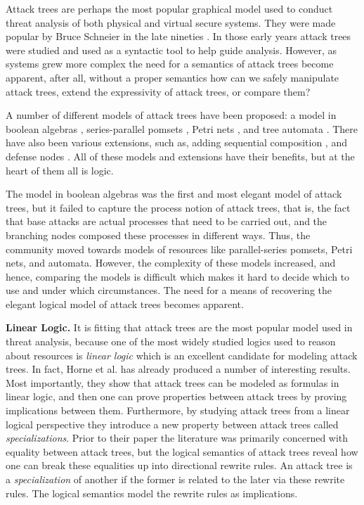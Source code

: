 Attack trees are perhaps the most popular graphical model used to
conduct threat analysis of both physical and virtual secure
systems. They were made popular by Bruce Schneier in the late nineties
\cite{Schneier:1999}.  In those early years attack trees were studied
and used as a syntactic tool to help guide analysis.  However, as
systems grew more complex the need for a semantics of attack trees
become apparent, after all, without a proper semantics how can we
safely manipulate attack trees, extend the expressivity of attack
trees, or compare them?

A number of different models of attack trees have been proposed: a
model in boolean algebras
\cite{Kordy:2014,Kordy:2012,Pietre-Cambacedes:2010}, series-parallel
pomsets \cite{Mauw:2006}, Petri nets \cite{McDermott:2001}, and tree
automata \cite{Camtepe:2007}.  There have also been various
extensions, such as, adding sequential composition \cite{Jhawar:2015},
and defense nodes \cite{Kordy:2011,Kordy:2012}.  All of these models
and extensions have their benefits, but at the heart of them all is
logic.

The model in boolean algebras was the first and most elegant model of
attack trees, but it failed to capture the process notion of attack
trees, that is, the fact that base attacks are actual processes that
need to be carried out, and the branching nodes composed these
processes in different ways.  Thus, the community moved towards models
of resources like parallel-series pomsets, Petri nets, and automata.
However, the complexity of these models increased, and hence,
comparing the models is difficult which makes it hard to decide which
to use and under which circumstances.  The need for a means of
recovering the elegant logical model of attack trees becomes apparent.

\textbf{Linear Logic.}  It is fitting that attack trees are the most
popular model used in threat analysis, because one of the most widely
studied logics used to reason about resources is \emph{linear logic}
which is an excellent candidate for modeling attack trees.  In fact,
Horne et al.\cite{horne2017semantics} has already produced a number of
interesting results.  Most importantly, they show that attack trees
can be modeled as formulas in linear logic, and then one can prove
properties between attack trees by proving implications between them.
Furthermore, by studying attack trees from a linear logical
perspective they introduce a new property between attack trees called
\emph{specializations}.  Prior to their paper the literature was
primarily concerned with equality between attack trees, but the
logical semantics of attack trees reveal how one can break these
equalities up into directional rewrite rules.  An attack tree is a
\emph{specialization} of another if the former is related to the later
via these rewrite rules.  The logical semantics model the rewrite
rules as implications.

